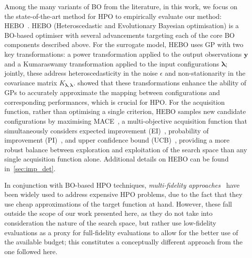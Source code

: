 Among the many variants of BO from the literature, in this work, we focus on the state-of-the-art method for HPO to empirically evaluate our method: HEBO~\citep{CowEtAl22}.
HEBO (Heteroscedastic and Evolutionary Bayesian optimisation) is a BO-based optimiser with several advancements 
targeting each of the core BO components described above.
For the surrogate model, HEBO uses GP with two key transformations: a power transformation applied to the output observations $\boldsymbol{y}$ and a Kumaraswamy transformation applied to the input configurations $\boldsymbol{\lambda}$; 
jointly, these address heteroscedasticity in the noise $\epsilon$ and non-stationarity in the covariance matrix $K_{\boldsymbol{\lambda},\boldsymbol{\lambda}}$.
\citet{CowEtAl22} showed that these transformations enhance the ability of GPs to accurately approximate the mapping between configurations and corresponding performances, which is crucial for HPO.
For the acquisition function, rather than optimising a single criterion, HEBO samples new candidate configurations by maximising MACE~\citep{LyuEtAl18}, a multi-objective acquisition function that simultaneously considers expected improvement (EI)~\citep{Mockus75}, probability of improvement (PI)~\citep{Kushner64}, and upper confidence bound (UCB)~\citep{ForEtAl08}, providing a more robust balance between exploration and exploitation of the search space than any single acquisition function alone.
Additional details on HEBO can be found in~\cref{sec:imp_det}.

In conjunction with BO-based HPO techniques, \emph{multi-fidelity approaches}~\citep{LiEtAl18,LiEtAl20,FalEtAl18,AwaEtAl21} have been widely used to address expensive HPO problems, due to the fact that they use cheap approximations of the target function at hand.
However, these fall outside the scope of our work presented here, as they do not take into consideration the nature of the search space, but rather use low-fidelity evaluations as a proxy for full-fidelity evaluations to allow for the better use of the available budget; this constitutes a conceptually different approach from the one followed here.






